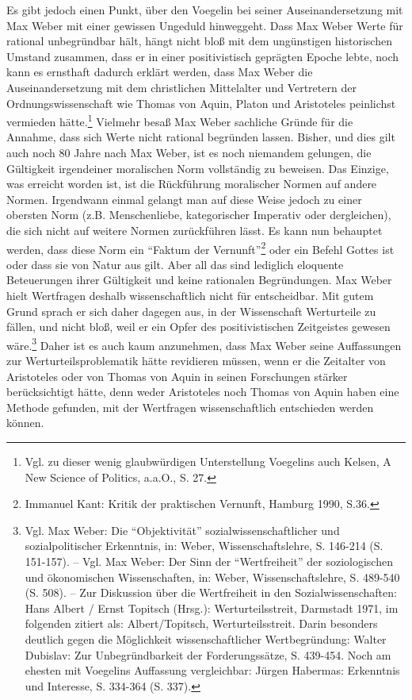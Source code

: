 Es gibt jedoch einen Punkt, über den Voegelin bei seiner Auseinandersetzung
mit Max Weber mit einer gewissen Ungeduld hinweggeht. Dass Max Weber Werte für
rational unbegründbar hält, hängt nicht bloß mit dem ungünstigen historischen
Umstand zusammen, dass er in einer positivistisch geprägten Epoche lebte, noch
kann es ernsthaft dadurch erklärt werden, dass Max Weber die
Auseinandersetzung mit dem christlichen Mittelalter und Vertretern der
Ordnungswissenschaft wie Thomas von Aquin, Platon und Aristoteles peinlichst
vermieden hätte.\footnote{Vgl. zu dieser wenig glaubwürdigen Unterstellung
  Voegelins auch Kelsen, A New Science of Politics, a.a.O., S.  27.} Vielmehr
besaß Max Weber sachliche Gründe für die Annahme, dass sich Werte nicht
rational begründen lassen. Bisher, und dies gilt auch noch 80 Jahre nach Max
Weber, ist es noch niemandem gelungen, die Gültigkeit irgendeiner moralischen
Norm vollständig zu beweisen. Das Einzige, was erreicht worden ist, ist die
Rückführung moralischer Normen auf andere Normen.  Irgendwann einmal gelangt
man auf diese Weise jedoch zu einer obersten Norm (z.B. Menschenliebe,
kategorischer Imperativ oder dergleichen), die sich nicht auf weitere Normen
zurückführen lässt. Es kann nun behauptet werden, dass diese Norm ein "`Faktum
der Vernunft"'\footnote{Immanuel Kant: Kritik der praktischen Vernunft,
  Hamburg 1990, S.36.} oder ein Befehl Gottes ist oder dass sie von Natur aus
gilt. Aber all das sind lediglich eloquente Beteuerungen ihrer Gültigkeit und
keine rationalen Begründungen. Max Weber hielt Wertfragen deshalb
wissenschaftlich nicht für entscheidbar. Mit gutem Grund sprach er sich daher
dagegen aus, in der Wissenschaft Werturteile zu fällen, und nicht bloß, weil
er ein Opfer des positivistischen Zeitgeistes gewesen wäre.\footnote{Vgl.  Max
  Weber: Die "`Objektivität"' sozialwissenschaftlicher und sozialpolitischer
  Erkenntnis, in: Weber, Wissenschaftslehre, S. 146-214 (S. 151-157). -- Vgl.
  Max Weber: Der Sinn der "`Wertfreiheit"' der soziologischen und ökonomischen
  Wissenschaften, in: Weber, Wissenschaftslehre, S. 489-540 (S. 508). -- Zur
  Diskussion über die Wertfreiheit in den Sozialwissenschaften: Hans Albert /
  Ernst Topitsch (Hrsg.): Werturteilsstreit, Darmstadt 1971, im folgenden
  zitiert als: Albert/Topitsch, Werturteilsstreit. Darin besonders deutlich
  gegen die Möglichkeit wissenschaftlicher Wertbegründung: Walter Dubislav:
  Zur Unbegründbarkeit der Forderungssätze, S. 439-454. Noch am ehesten mit
  Voegelins Auf\/fassung vergleichbar: Jürgen Habermas: Erkenntnis und
  Interesse, S. 334-364 (S. 337).} Daher ist es auch kaum anzunehmen, dass Max
Weber seine Auf\/fassungen zur Werturteilsproblematik hätte revidieren müssen,
wenn er die Zeitalter von Aristoteles oder von Thomas von Aquin in seinen
Forschungen stärker berücksichtigt hätte, denn weder Aristoteles noch Thomas
von Aquin haben eine Methode gefunden, mit der Wertfragen wissenschaftlich
entschieden werden können.

